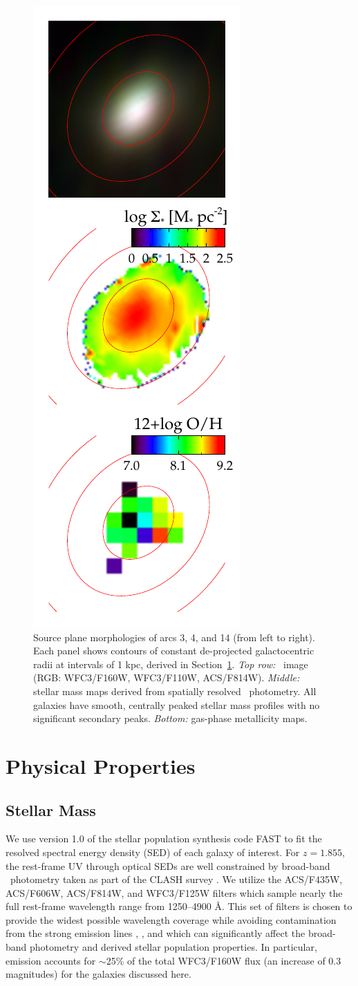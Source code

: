 \begin{figure}
    \includegraphics[width=.3\columnwidth]{figures/figure_arc14_source_corr.pdf}
    \caption[Source plane morphologies of arcs 3, 4, and 14.]{
    \label{fig:sourceplane}
    Source plane morphologies of arcs 3, 4, and 14 (from left to right). Each panel shows contours of constant de-projected galactocentric radii at intervals of 1 kpc, derived in Section~\ref{sec:properties}.
    \emph{ Top row:} \hst\ image (RGB: WFC3/F160W, WFC3/F110W, ACS/F814W).
    \emph{ Middle:} stellar mass maps derived from spatially resolved \hst\ photometry. All galaxies have smooth, centrally peaked stellar mass profiles with no significant secondary peaks.
    \emph{ Bottom:} gas-phase metallicity maps.
    }
\end{figure}


\section{Physical Properties}\label{sec:properties}

\subsection{Stellar Mass}\label{sec:mstar}

We use version 1.0 of the stellar population synthesis code FAST \citep{Kriek2009} to fit the resolved spectral
energy density (SED) of each galaxy of interest. For $z=1.855$, the rest-frame UV through optical SEDs are well
constrained by broad-band \hst\ photometry taken as part of the CLASH survey \citep{Postman2012}. We utilize the
ACS/F435W, ACS/F606W, ACS/F814W, and WFC3/F125W filters which sample nearly the full rest-frame wavelength range
from 1250--4900 \AA. This set of filters is chosen to provide the widest possible wavelength coverage while
avoiding contamination from the strong emission lines \lya, \OII, and \OIII which can significantly affect the
broad-band photometry and derived stellar population properties. In particular, \OIII emission accounts for
$\sim$25\% of the total WFC3/F160W flux (an increase of 0.3 magnitudes) for the galaxies discussed here.

